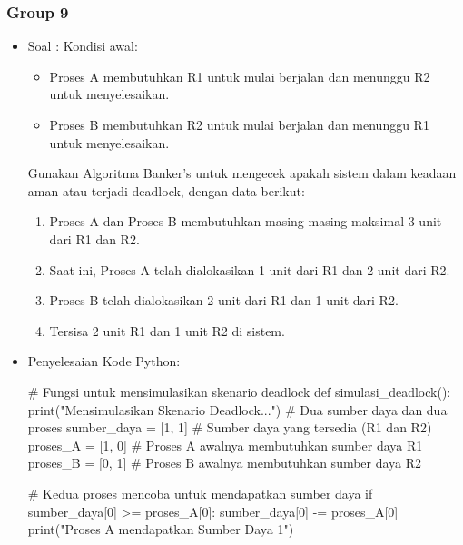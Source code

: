 \documentclass[12pt]{article}
\begin{document}
\subsubsection{}
\subsubsection{}
\subsubsection{}
\subsubsection{Group 9}
\begin{itemize}
    \item Soal : 
    Kondisi awal:

    \begin{itemize}
        \item Proses A membutuhkan R1 untuk mulai berjalan dan menunggu R2 untuk menyelesaikan.
        \item Proses B membutuhkan R2 untuk mulai berjalan dan menunggu R1 untuk menyelesaikan.
    \end{itemize}
    Gunakan Algoritma Banker's untuk mengecek apakah sistem dalam keadaan aman atau terjadi deadlock, dengan data berikut:
    \begin{enumerate}
        \item Proses A dan Proses B membutuhkan masing-masing maksimal 3 unit dari R1 dan R2.
        \item Saat ini, Proses A telah dialokasikan 1 unit dari R1 dan 2 unit dari R2.
        \item Proses B telah dialokasikan 2 unit dari R1 dan 1 unit dari R2.
        \item Tersisa 2 unit R1 dan 1 unit R2 di sistem.
    \end{enumerate}

    \item Penyelesaian Kode Python:
    \begin{python}
# Fungsi untuk mensimulasikan skenario deadlock
def simulasi_deadlock():
    print("Mensimulasikan Skenario Deadlock...")
    # Dua sumber daya dan dua proses
    sumber_daya = [1, 1]  # Sumber daya yang tersedia (R1 dan R2)
    proses_A = [1, 0]  # Proses A awalnya membutuhkan sumber daya R1
    proses_B = [0, 1]  # Proses B awalnya membutuhkan sumber daya R2
    
    # Kedua proses mencoba untuk mendapatkan sumber daya
    if sumber_daya[0] >= proses_A[0]:
        sumber_daya[0] -= proses_A[0]
        print("Proses A mendapatkan Sumber Daya 1")


\end{python}
\end{itemize}
\end{document}
